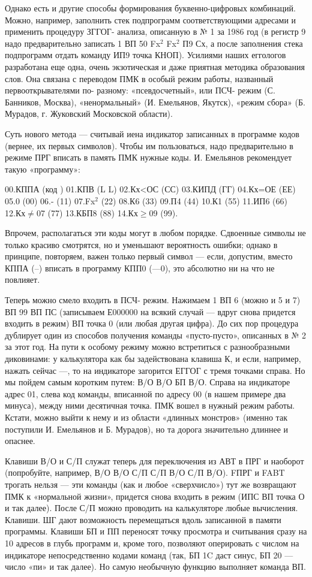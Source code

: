 \documentclass[11pt,a4paper,oneside]{article}
\begin{document}
Однако есть и другие способы формирования буквенно-цифровых комбинаций. Можно, например, заполнить стек подпрограмм соответствующими адресами и применить процедуру ЗГГОГ- анализа, описанную в № 1 за 1986 год (в регистр 9 надо предварительно записать 1 ВП 50 Fx$^{2}$ Fx$^{2}$ П9 Сх, а после заполнения стека подпрограмм отдать команду ИП9 точка КНОП). Усилиями наших еггологов разработана еще одна, очень экзотическая и даже приятная методика образования слов. Она связана с переводом ПМК в особый режим работы, названный первооткрывателями по- разному: «псевдосчетный», или ПСЧ- режим (С. Банников, Москва), «ненормальный» (И. Емельянов, Якутск), «режим сбора» (Б. Мурадов, г. Жуковский Московской области).

Суть нового метода — считывай иена индикатор записанных в программе кодов (вернее, их первых символов). Чтобы им пользоваться, надо предварительно в режиме ПРГ вписать в память ПМК нужные коды. И. Емельянов рекомендует такую «программу»: 

00.КППА (код	) 01.КПВ (L L) 02.Кх<ОС (СС) 03.КИПД (ГГ) 04.Кх=ОЕ (ЕЕ) 05.0 (00) 06.- (11) 07.Fx$^{2}$ (22) 08.К6 (33) 09.П4 (44) 10.К1 (55) 11.ИП6 (66) 12.Кх$\neq$07 (77) 13.КБП8 (88) 14.Кх$\geq$09 (99). 

Впрочем, располагаться эти коды могут в любом порядке. Сдвоенные символы не только красиво смотрятся, но и уменьшают вероятность ошибки; однако в принципе, повторяем, важен только первый символ — если, допустим, вместо КППА (--) вписать в программу КПП0 (—0), это абсолютно ни на что не повлияет.

Теперь можно смело входить в ПСЧ- режим. Нажимаем 1 ВП 6 (можно и 5 и 7) ВП 99 ВП ПС (записываем Е000000 на всякий случай — вдруг снова придется входить в режим) ВП точка 0 (или любая другая цифра). До сих пор процедура дублирует один из способов получения команды «пусто-пусто», описанных в № 2 за этот год. На пути к особому режиму можно встретиться с разнообразными диковинами: у калькулятора как бы задействована клавиша К, и если, например, нажать сейчас —, то на индикаторе загорится ЕГГОГ с тремя точками справа. Но мы пойдем самым коротким путем: В/О В/О БП В/О. Справа на индикаторе адрес 01, слева код команды, вписанной по адресу 00 (в нашем примере два минуса), между ними десятичная точка. ПМК вошел в нужный режим работы. Кстати, можно выйти к нему и из области «длинных монстров» (именно так поступили И. Емельянов и Б. Мурадов), но та дорога значительно длиннее и опаснее.

Клавиши В/О и С/П служат теперь для переключения из АВТ в ПРГ и наоборот (попробуйте, например, В/О В/О С/П С/П В/О С/П В/О). FПРГ и FABT трогать нельзя — эти команды (как и любое «сверхчисло») тут же возвращают ПМК к «нормальной жизни», придется снова входить в режим (ИПС ВП точка О и так далее). После С/П можно проводить на калькуляторе любые вычисления. Клавиши. ШГ дают возможность перемещаться вдоль записанной в памяти программы. Клавиши БП и ПП переносят точку просмотра и считывания сразу на 10 адресов в глубь программ и, кроме того, позволяют оперировать с числом на индикаторе непосредственно кодами команд (так, БП 1C даст синус, БП 20 — число «пи» и так далее). Но самую необычную функцию выполняет команда ВП.
\end{document}
